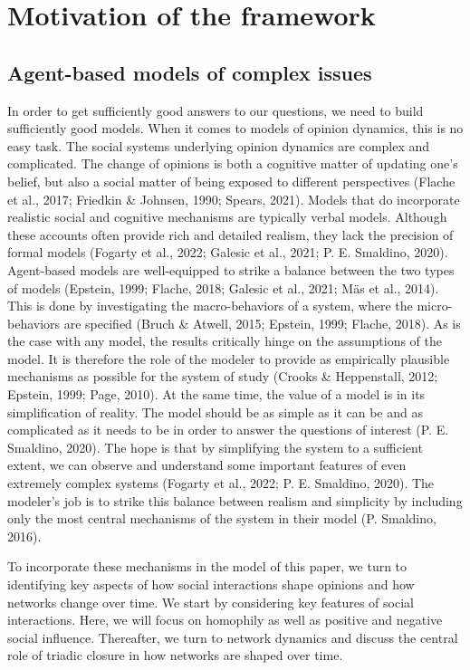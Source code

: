 \documentclass{article}
\begin{document}
\section{Motivation of the framework}
\subsection{Agent-based models of complex issues}

In order to get sufficiently good answers to our questions, we need to build sufficiently good models. When it comes to models of opinion dynamics, this is no easy task. The social systems underlying opinion dynamics are complex and complicated. The change of opinions is both a cognitive matter of updating one’s belief, but also a social matter of being exposed to different perspectives (Flache et al., 2017; Friedkin \& Johnsen, 1990; Spears, 2021). Models that do incorporate realistic social and cognitive mechanisms are typically verbal models. Although these accounts often provide rich and detailed realism, they lack the precision of formal models (Fogarty et al., 2022; Galesic et al., 2021; P. E. Smaldino, 2020). Agent-based models are well-equipped to strike a balance between the two types of models (Epstein, 1999; Flache, 2018; Galesic et al., 2021; Mäs et al., 2014). This is done by investigating the macro-behaviors of a system, where the micro-behaviors are specified (Bruch \& Atwell, 2015; Epstein, 1999; Flache, 2018). As is the case with any model, the results critically hinge on the assumptions of the model. It is therefore the role of the modeler to provide as empirically plausible mechanisms as possible for the system of study (Crooks \& Heppenstall, 2012; Epstein, 1999; Page, 2010). At the same time, the value of a model is in its simplification of reality. The model should be as simple as it can be and as complicated as it needs to be in order to answer the questions of interest (P. E. Smaldino, 2020). The hope is that by simplifying the system to a sufficient extent, we can observe and understand some important features of even extremely complex systems (Fogarty et al., 2022; P. E. Smaldino, 2020). The modeler’s job is to strike this balance between realism and simplicity by including only the most central mechanisms of the system in their model (P. Smaldino, 2016). 

To incorporate these mechanisms in the model of this paper, we turn to identifying key aspects of how social interactions shape opinions and how networks change over time. We start by considering key features of social interactions. Here, we will focus on homophily as well as positive and negative social influence. Thereafter, we turn to network dynamics and discuss the central role of triadic closure in how networks are shaped over time.
\end{document}

